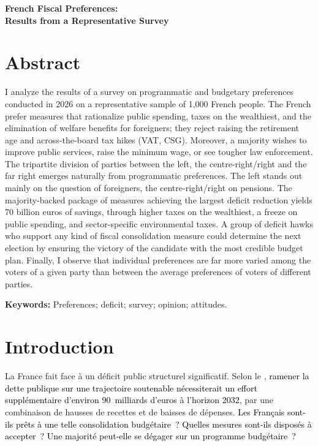 \documentclass[12pt,french]{article}
\newcommand{\blue}[1]{\textcolor{black}{#1}} %
\begin{document}
\clearpage
\newpage

\begin{center}
  {\Large\bfseries French Fiscal Preferences:\\ Results from a Representative Survey\par}
\end{center}

\section*{Abstract}
I analyze the results of a survey on programmatic and budgetary preferences conducted in 2026 on a representative sample of 1,000 French people. The French prefer measures that rationalize public spending, taxes on the wealthiest, and the elimination of welfare benefits for foreigners; they reject raising the retirement age and across-the-board tax hikes (VAT, CSG). Moreover, a majority wishes to improve public services, raise the minimum wage, or see tougher law enforcement. The tripartite division of parties between the left, the centre-right/right and the far right emerges naturally from programmatic preferences. The left stands out mainly on the question of foreigners, the centre-right/right on pensions. The majority-backed package of measures achieving the largest deficit reduction yields 70 billion euros of savings, through higher taxes on the wealthiest, a freeze on public spending, and sector-specific environmental taxes. A group of deficit hawks who support any kind of fiscal consolidation measure could determine the next election by ensuring the victory of the candidate with the most credible budget plan. Finally, I observe that individual preferences are far more varied among the voters of a given party than between the average preferences of voters of different parties.

\medskip\noindent
\textbf{Keywords:} Preferences; deficit; survey; opinion; attitudes.

\clearpage
\newpage

\section{Introduction}
\label{sec:intro}

La France fait face à un déficit public structurel significatif. Selon le \citet{CAE2025}, \blue{ramener la dette publique sur une trajectoire soutenable %
nécessiterait un effort supplémentaire d'environ 90~milliards d'euros à l'horizon 2032}, par une combinaison de hausses de recettes et de baisses de dépenses. 
\blue{Les Français sont-ils prêts à une telle consolidation budgétaire~? Quelles mesures sont-ils disposés à accepter~? Une majorité peut-elle se dégager sur un programme budgétaire~?}
\end{document}
